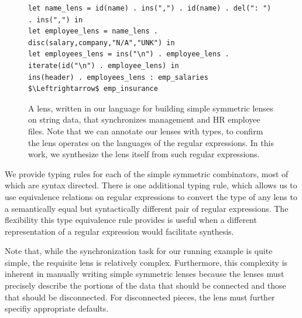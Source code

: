 \documentclass[acmsmall,screen,anonymous]{acmart}
\begin{document}
\begin{figure}
\begin{lstlisting}
let name_lens = id(name) . ins(",") . id(name) . del(": ") . ins(",") in
let employee_lens = name_lens . disc(salary,company,"N/A","UNK") in
let employees_lens = ins("\n") . employee_lens . iterate(id("\n") . employee_lens) in
ins(header) . employees_lens : emp_salaries $\Leftrightarrow$ emp_insurance
\end{lstlisting}
  \caption{A lens, written in our language for building simple symmetric lenses
    on string data, that synchronizes management and HR employee files.
    Note that we can annotate our lenses with types, to confirm the lens
    operates on the languages of the regular expressions. In this work, we
    synthesize the lens itself from such regular expressions.}
  \label{fig:example_lens}
\end{figure}



We provide typing rules for each of the simple symmetric combinators,
most of which are syntax directed.  There is one additional
typing rule, which allows us to use equivalence relations on regular
expressions to convert the type of any lens to a semantically equal
but syntactically different pair of regular expressions.  The flexibility this
type equivalence rule provides is useful when a different
representation of a regular expression would facilitate synthesis. 


Note that, while the synchronization task for our running example is quite simple, the
requisite lens is relatively complex. Furthermore, this complexity is
inherent in manually writing simple symmetric lenses because the
lenses must precisely describe the portions of the data that should be
connected and those that should be disconnected.  For disconnected
pieces, the lens must further specifiy appropriate defaults.
\end{document}
